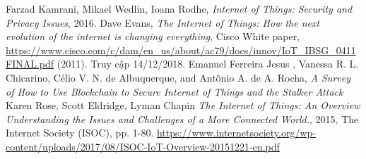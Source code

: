 \begin{thebibliography}{9}
Farzad Kamrani, Mikael Wedlin, Ioana Rodhe, \textit{Internet of Things: Security and Privacy Issues}, 2016.
Dave Evans, \textit{The Internet of Things: How the next evolution of the internet is changing everything}, Cisco White paper, \url{https://www.cisco.com/c/dam/en_us/about/ac79/docs/innov/IoT\_IBSG\_0411FINAL.pdf} (2011). Truy cập 14/12/2018.
Emanuel Ferreira Jesus , Vanessa R. L. Chicarino, Célio V. N. de Albuquerque, and Antônio A. de A. Rocha, \textit{A Survey of How to Use Blockchain to Secure Internet of Things and the Stalker Attack}
Karen Rose, Scott Eldridge, Lyman Chapin \textit{The Internet of Things: An Overview Understanding the Issues and Challenges of a
More Connected World.}, 2015, The Internet Society (ISOC), pp. 1-80. \url{https://www.internetsociety.org/wp-content/uploads/2017/08/ISOC-IoT-Overview-20151221-en.pdf}
\end{thebibliography}
